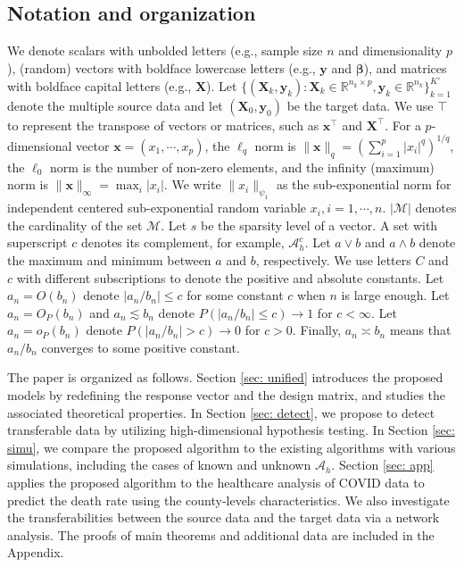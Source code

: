 \documentclass[twoside,12pt]{article}
\newcommand{\mb}[1]{\boldsymbol{\mathbf{#1}}}
\begin{document}
	\subsection{Notation and organization}
	We denote scalars with unbolded letters (e.g.,  sample size $n$ and dimensionality $p$), (random) vectors with boldface lowercase letters (e.g.,  $\mb y$ and $\mb\beta$),  and matrices with boldface capital letters (e.g., $\mb X$). 
	Let $\{(\mb X_k, \mb y_k): \mb X_k\in\mathbb{R}^{n_k\times p},  \mb y_k\in\mathbb{R}^{n_k}\}_{k=1}^{K'}$ denote the multiple source data and let $(\mb X_0, \mb y_0)$ be the target data. 
	We use $\top$ to represent the transpose of vectors or matrices, such as $\mb x^\top$ and $\mb X^\top$.
	For a $p$-dimensional vector $\mb x=(x_1, \cdots, x_p)$, the $\ell_q$ norm is $\|\mb x\|_q=(\sum_{i=1}^p |x_i|^q)^{1/q}$, the $\ell_0$ norm is the number of non-zero elements, and the infinity (maximum) norm is $\|\mb x\|_{\infty}=\max_i |x_i|$.
	We write $\|x_i\|_{\psi_1}$ as the sub-exponential norm for independent centered sub-exponential random variable $x_i, i=1,\cdots,n$.
	$|\mathcal{M}|$ denotes the cardinality of the set $\mathcal{M}$.
	Let $s$ be the sparsity level of a vector. 
	A set with superscript $c$ denotes its complement, for example, $\mathcal{A}_h^c$.
	Let $a \vee b$ and $a \wedge b$ denote the maximum and minimum between $a$ and $b$, respectively.
	We use letters $C$ and $c$ with different subscriptions to denote the positive and absolute constants.
	Let $a_n=O(b_n)$ denote $|a_n/b_n|\leq c$ for some constant $c$ when $n$ is large enough.
	Let $a_n=O_P(b_n)$ and $a_n\lesssim b_n$ denote $P(|a_n/b_n|\leq c)\rightarrow 1$ for $c<\infty$.
	Let $a_n=o_P(b_n)$ denote $P(|a_n/b_n|> c)\rightarrow 0$ for $c>0$.
	Finally, $a_n\asymp b_n$ means that $a_n/b_n$ converges to some positive constant.
	
	The paper is organized as follows. Section \ref{sec: unified} introduces the proposed models by redefining the response vector and the design matrix, and studies the associated theoretical properties.
	In Section \ref{sec: detect}, we propose to detect transferable data by utilizing high-dimensional hypothesis testing.
	In Section \ref{sec: simu}, we compare the proposed algorithm to the existing algorithms with various simulations, including the cases of known and unknown $\mathcal A_h$.
	Section \ref{sec: app} applies the proposed algorithm to the healthcare analysis of COVID data to predict the death rate using the county-levels characteristics.
	We also investigate the transferabilities between the source data and the target data via a network analysis.
	The proofs of main theorems and additional data are included in the Appendix.
	
\end{document}
